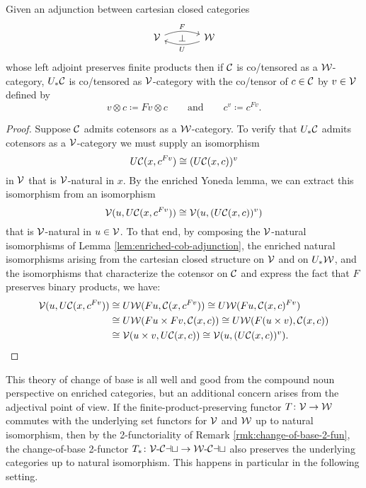 \begin{prop}\label{prop:cob-adjunction}
Given an adjunction between cartesian closed categories
\[
\begin{tikzcd}[column sep=large]
\cV \arrow[r, bend left=20, "F"] \arrow[r, phantom, "\bot"] & \cW \arrow[l, bend left=20, "U"]   \end{tikzcd}
\]
whose left adjoint preserves finite products then if ${\mathord{\mathcal{C}}}$ is co/tensored as a ${\mathord{\mathcal{W}}}$-cat\-e\-gory,  $U_*{\mathord{\mathcal{C}}}$ is co/tensored as ${\mathord{\mathcal{V}}}$-category with the co/tensor of $c \in {\mathord{\mathcal{C}}}$ by $v \in {\mathord{\mathcal{V}}}$ defined by
\[ v \otimes c \coloneq Fv \otimes c \qquad \text{and} \qquad c^v \coloneq c^{Fv}.\]
\end{prop}
\begin{proof}
Suppose ${\mathord{\mathcal{C}}}$ admits cotensors as a ${\mathord{\mathcal{W}}}$-category. To verify that $U_*{\mathord{\mathcal{C}}}$ admits cotensors as a ${\mathord{\mathcal{V}}}$-category we must supply an isomorphism
\[ U{\mathord{\mathcal{C}}}(x,c^{Fv}) \cong (U{\mathord{\mathcal{C}}}(x,c))^v\] in ${\mathord{\mathcal{V}}}$ that is ${\mathord{\mathcal{V}}}$-natural in $x$. By the enriched Yoneda lemma, we can extract this isomorphism from an isomorphism \[ {\mathord{\mathcal{V}}}(u,U{\mathord{\mathcal{C}}}(x,c^{Fv})) \cong {\mathord{\mathcal{V}}}(u,(U{\mathord{\mathcal{C}}}(x,c))^v)\] that is ${\mathord{\mathcal{V}}}$-natural in $u \in {\mathord{\mathcal{V}}}$. To that end, by composing the ${\mathord{\mathcal{V}}}$-natural isomorphisms of Lemma \ref{lem:enriched-cob-adjunction}, the enriched natural isomorphisms arising from the cartesian closed structure on ${\mathord{\mathcal{V}}}$ and on $U_*{\mathord{\mathcal{W}}}$, and the isomorphisms that characterize the cotensor on ${\mathord{\mathcal{C}}}$ and express the fact that $F$ preserves binary products, we have:
\begin{align*} {\mathord{\mathcal{V}}}(u,U{\mathord{\mathcal{C}}}(x,c^{Fv})) &\cong U{\mathord{\mathcal{W}}}(Fu, {\mathord{\mathcal{C}}}(x,c^{Fv})) \cong U{\mathord{\mathcal{W}}}(Fu, {\mathord{\mathcal{C}}}(x,c)^{Fv}) \\ &\cong U{\mathord{\mathcal{W}}}(Fu \times Fv, {\mathord{\mathcal{C}}}(x,c))  \cong U{\mathord{\mathcal{W}}}(F(u \times v), {\mathord{\mathcal{C}}}(x,c)) \\ &\cong {\mathord{\mathcal{V}}}(u \times v, U{\mathord{\mathcal{C}}}(x,c)) \cong {\mathord{\mathcal{V}}}(u, (U{\mathord{\mathcal{C}}}(x,c))^v). \qedhere\end{align*}
\end{proof}



This theory of change of base is all well and good from the compound noun perspective on enriched categories, but an additional concern arises from the adjectival point of view. If the finite-product-preserving functor $T \colon {\mathord{\mathcal{V}}} \to {\mathord{\mathcal{W}}}$ commutes with the underlying set functors for ${\mathord{\mathcal{V}}}$ and ${\mathord{\mathcal{W}}}$ up to natural isomorphism, then by the 2-functoriality of Remark \ref{rmk:change-of-base-2-fun}, the change-of-base 2-functor $T_* \colon {{\mathord{\mathcal{V}}}}\text{-}{\mathord{\mathcal{Cat}}} \to {{\mathord{\mathcal{W}}}}\text{-}{\mathord{\mathcal{Cat}}}$ also preserves the underlying categories up to natural isomorphism. This happens in particular in the following setting.


